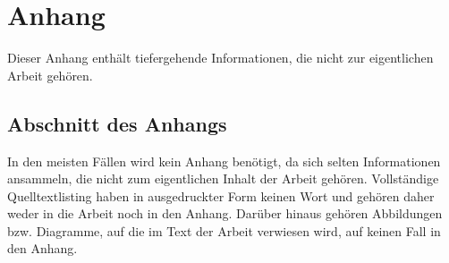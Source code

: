 
\chapter{Anhang}

Dieser Anhang enthält tiefergehende Informationen, die nicht zur eigentlichen Arbeit gehören.

\section{Abschnitt des Anhangs}

In den meisten Fällen wird kein Anhang benötigt, da sich selten Informationen ansammeln, die nicht zum eigentlichen Inhalt der Arbeit gehören. Vollständige Quelltextlisting haben in ausgedruckter Form keinen Wort und gehören daher weder in die Arbeit noch in den Anhang. Darüber hinaus gehören Abbildungen bzw. Diagramme, auf die im Text der Arbeit verwiesen wird, auf keinen Fall in den Anhang.
